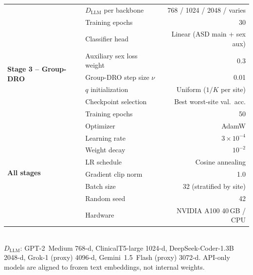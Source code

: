 \documentclass[runningheads]{llncs}
\begin{document}
\begin{table}[htbp]
\begin{tabular}{llr}
 & $D_{\mathrm{LLM}}$ per backbone             & 768 / 1024 / 2048 / varies \\
 & Training epochs                             & 30 \\
\midrule
\multirow{6}{*}{\textbf{Stage 3 -- Group-DRO}}
 & Classifier head                             & Linear (ASD main + sex aux) \\
 & Auxiliary sex loss weight                   & 0.3 \\
 & Group-DRO step size $\nu$                   & 0.01 \\
 & $q$ initialization                          & Uniform ($1/K$ per site) \\
 & Checkpoint selection                        & Best worst-site val.\ acc. \\
 & Training epochs                             & 50 \\
\midrule
\multirow{8}{*}{\textbf{All stages}}
 & Optimizer                                   & AdamW \\
 & Learning rate                               & $3{\times}10^{-4}$ \\
 & Weight decay                                & $10^{-2}$ \\
 & LR schedule                                 & Cosine annealing \\
 & Gradient clip norm                          & 1.0 \\
 & Batch size                                  & 32 (stratified by site) \\
 & Random seed                                 & 42 \\
 & Hardware                                    & NVIDIA A100 40\,GB / CPU \\
\bottomrule
\end{tabular}
\\[3pt]
{\footnotesize $D_{\mathrm{LLM}}$: GPT-2~Medium 768-d, ClinicalT5-large 1024-d, DeepSeek-Coder-1.3B 2048-d, Grok-1 (proxy) 4096-d, Gemini~1.5~Flash (proxy) 3072-d. API-only models are aligned to frozen text embeddings, not internal weights.}
\end{table}
%
\end{document}
